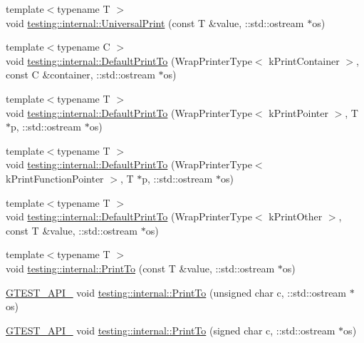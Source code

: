 \begin{DoxyCompactItemize}
\item 
{\footnotesize template$<$typename T $>$ }\\void \mbox{\hyperlink{namespacetesting_1_1internal_a30708fa2bacf11895b03bdb21eb72309}{testing\+::internal\+::\+Universal\+Print}} (const T \&value, \+::std\+::ostream $\ast$os)
\item 
{\footnotesize template$<$typename C $>$ }\\void \mbox{\hyperlink{namespacetesting_1_1internal_a2e96c98d5bd8ee4a1b92f8e3cde7dd40}{testing\+::internal\+::\+Default\+Print\+To}} (Wrap\+Printer\+Type$<$ k\+Print\+Container $>$, const C \&container, \+::std\+::ostream $\ast$os)
\item 
{\footnotesize template$<$typename T $>$ }\\void \mbox{\hyperlink{namespacetesting_1_1internal_a074522dd8d77d61878a042b8d05cc64a}{testing\+::internal\+::\+Default\+Print\+To}} (Wrap\+Printer\+Type$<$ k\+Print\+Pointer $>$, T $\ast$p, \+::std\+::ostream $\ast$os)
\item 
{\footnotesize template$<$typename T $>$ }\\void \mbox{\hyperlink{namespacetesting_1_1internal_a7729c07abcae6c69b9b370c39db61409}{testing\+::internal\+::\+Default\+Print\+To}} (Wrap\+Printer\+Type$<$ k\+Print\+Function\+Pointer $>$, T $\ast$p, \+::std\+::ostream $\ast$os)
\item 
{\footnotesize template$<$typename T $>$ }\\void \mbox{\hyperlink{namespacetesting_1_1internal_a72b1a69d96be8ea6382539f5c4fcac6d}{testing\+::internal\+::\+Default\+Print\+To}} (Wrap\+Printer\+Type$<$ k\+Print\+Other $>$, const T \&value, \+::std\+::ostream $\ast$os)
\item 
{\footnotesize template$<$typename T $>$ }\\void \mbox{\hyperlink{namespacetesting_1_1internal_adb3c27150dbe661db0e0c4be27533460}{testing\+::internal\+::\+Print\+To}} (const T \&value, \+::std\+::ostream $\ast$os)
\item 
\mbox{\hyperlink{gtest-port_8h_aa73be6f0ba4a7456180a94904ce17790}{G\+T\+E\+S\+T\+\_\+\+A\+P\+I\+\_\+}} void \mbox{\hyperlink{namespacetesting_1_1internal_ab7524d6d3ab8c31b1deea88bf61783bb}{testing\+::internal\+::\+Print\+To}} (unsigned char c, \+::std\+::ostream $\ast$os)
\item 
\mbox{\hyperlink{gtest-port_8h_aa73be6f0ba4a7456180a94904ce17790}{G\+T\+E\+S\+T\+\_\+\+A\+P\+I\+\_\+}} void \mbox{\hyperlink{namespacetesting_1_1internal_ad453af399370e394881079c243abacb4}{testing\+::internal\+::\+Print\+To}} (signed char c, \+::std\+::ostream $\ast$os)

\end{DoxyCompactItemize}
